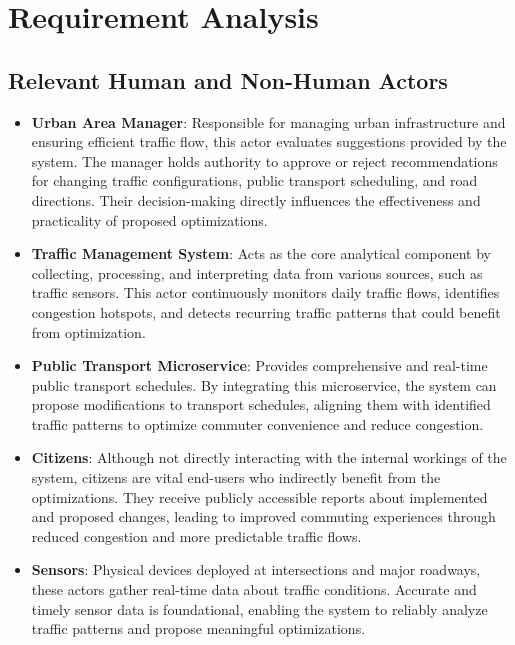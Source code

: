\documentclass[a4paper,12pt]{article}
\begin{document}
\newpage 



\subtitle{Type 2}

\section{Requirement Analysis}
\subsection{Relevant Human and Non-Human Actors}

\begin{itemize}
    \item \textbf{Urban Area Manager}:
Responsible for managing urban infrastructure and ensuring efficient traffic flow, this actor evaluates suggestions provided by the system. The manager holds authority to approve or reject recommendations for changing traffic configurations, public transport scheduling, and road directions. Their decision-making directly influences the effectiveness and practicality of proposed optimizations.

\item \textbf{Traffic Management System}:
Acts as the core analytical component by collecting, processing, and interpreting data from various sources, such as traffic sensors. This actor continuously monitors daily traffic flows, identifies congestion hotspots, and detects recurring traffic patterns that could benefit from optimization.

\item \textbf{Public Transport Microservice}:
Provides comprehensive and real-time public transport schedules. By integrating this microservice, the system can propose modifications to transport schedules, aligning them with identified traffic patterns to optimize commuter convenience and reduce congestion.

\item \textbf{Citizens}:
Although not directly interacting with the internal workings of the system, citizens are vital end-users who indirectly benefit from the optimizations. They receive publicly accessible reports about implemented and proposed changes, leading to improved commuting experiences through reduced congestion and more predictable traffic flows.

\item \textbf{Sensors}:
Physical devices deployed at intersections and major roadways, these actors gather real-time data about traffic conditions. Accurate and timely sensor data is foundational, enabling the system to reliably analyze traffic patterns and propose meaningful optimizations.
\end{itemize}
\end{document}
